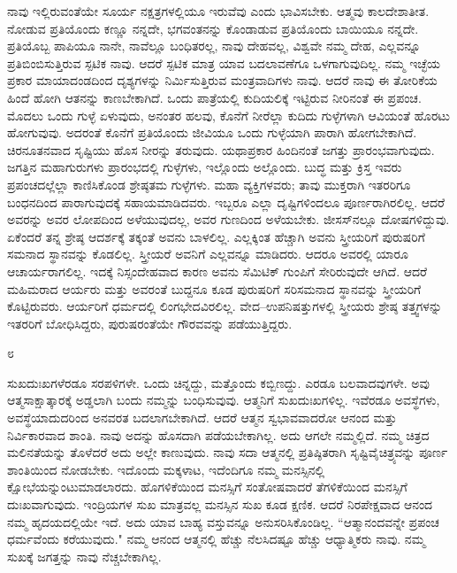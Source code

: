 ನಾವು ಇಲ್ಲಿರುವಂತೆಯೇ ಸೂರ್ಯ ನಕ್ಷತ್ರಗಳಲ್ಲಿಯೂ ಇರುವೆವು ಎಂದು ಭಾವಿಸಬೇಕು. ಆತ್ಮವು ಕಾಲದೇಶಾತೀತ. ನೋಡುವ ಪ್ರತಿಯೊಂದು ಕಣ್ಣೂ ನನ್ನದೇ, ಭಗವಂತನನ್ನು ಕೊಂಡಾಡುವ ಪ್ರತಿಯೊಂದು ಬಾಯಿಯೂ ನನ್ನದೇ. ಪ್ರತಿಯೊಬ್ಬ ಪಾಪಿಯೂ ನಾನೇ, ನಾವೆಲ್ಲೂ ಬಂಧಿತರಲ್ಲ, ನಾವು ದೇಹವಲ್ಲ, ವಿಶ್ವವೇ ನಮ್ಮ ದೇಹ, ಎಲ್ಲವನ್ನೂ ಪ್ರತಿಬಿಂಬಿಸುತ್ತಿರುವ ಸ್ಪಟಿಕ ನಾವು. ಆದರೆ ಸ್ಪಟಿಕ ಮಾತ್ರ ಯಾವ ಬದಲಾವಣೆಗೂ ಒಳಗಾಗುವುದಿಲ್ಲ. ನಮ್ಮ ಇಚ್ಛೆಯ ಪ್ರಕಾರ ಮಾಯಾದಂಡದಿಂದ ದೃಶ್ಯಗಳನ್ನು ನಿರ್ಮಿಸುತ್ತಿರುವ ಮಂತ್ರವಾದಿಗಳು ನಾವು. ಆದರೆ ನಾವು ಈ ತೋರಿಕೆಯ ಹಿಂದೆ ಹೋಗಿ ಆತನನ್ನು ಕಾಣಬೇಕಾಗಿದೆ. ಒಂದು ಪಾತ್ರೆಯಲ್ಲಿ ಕುದಿಯಲಿಕ್ಕೆ ಇಟ್ಟಿರುವ ನೀರಿನಂತೆ ಈ ಪ್ರಪಂಚ. ಮೊದಲು ಒಂದು ಗುಳ್ಳೆ ಏಳುವುದು, ಅನಂತರ ಹಲವು, ಕೊನೆಗೆ ನೀರೆಲ್ಲಾ ಕುದಿದು ಗುಳ್ಳೆಗಳಾಗಿ ಆವಿಯಂತೆ ಹೊರಟು ಹೋಗುವುವು. ಅದರಂತೆ ಕೊನೆಗೆ ಪ್ರತಿಯೊಂದು ಜೀವಿಯೂ ಒಂದು ಗುಳ್ಳೆಯಾಗಿ ಪಾರಾಗಿ ಹೋಗಬೇಕಾಗಿದೆ. ಚಿರನೂತನವಾದ ಸೃಷ್ಟಿಯು ಹೊಸ ನೀರನ್ನು ತರುವುದು. ಯಥಾಪ್ರಕಾರ ಹಿಂದಿನಂತೆ ಜಗತ್ತು ಪ್ರಾರಂಭವಾಗುವುದು. ಜಗತ್ತಿನ ಮಹಾಗುರುಗಳು ಪ್ರಾರಂಭದಲ್ಲಿ ಗುಳ್ಳೆಗಳು, ಇಲ್ಲೊಂದು ಅಲ್ಲೊಂದು. ಬುದ್ಧ ಮತ್ತು ಕ್ರಿಸ್ತ ಇವರು ಪ್ರಪಂಚದಲ್ಲೆಲ್ಲಾ ಕಾಣಿಸಿಕೊಂಡ ಶ್ರೇಷ್ಠತಮ ಗುಳ್ಳೆಗಳು. ಮಹಾ ವ್ಯಕ್ತಿಗಳವರು; ತಾವು ಮುಕ್ತರಾಗಿ ಇತರರಿಗೂ ಬಂಧನದಿಂದ ಪಾರಾಗುವುದಕ್ಕೆ ಸಹಾಯಮಾಡಿದವರು. ಇಬ್ಬರೂ ಎಲ್ಲಾ ದೃಷ್ಟಿಗಳಿಂದಲೂ ಪೂರ್ಣರಾಗಿರಲಿಲ್ಲ. ಆದರೆ ಅವರನ್ನು ಅವರ ಲೋಪದಿಂದ ಅಳೆಯುವುದಲ್ಲ, ಅವರ ಗುಣದಿಂದ ಅಳೆಯಬೇಕು. ಜೀಸಸ್‌ನಲ್ಲೂ ದೋಷಗಳಿದ್ದುವು. ಏಕೆಂದರೆ ತನ್ನ ಶ್ರೇಷ್ಠ ಆದರ್ಶಕ್ಕೆ ತಕ್ಕಂತೆ ಅವನು ಬಾಳಲಿಲ್ಲ. ಎಲ್ಲಕ್ಕಿಂತ ಹೆಚ್ಚಾಗಿ ಅವನು ಸ್ತ್ರೀಯರಿಗೆ ಪುರುಷರಿಗೆ ಸಮನಾದ ಸ್ಥಾನವನ್ನು ಕೊಡಲಿಲ್ಲ. ಸ್ತ್ರೀಯರೆ ಅವನಿಗೆ ಎಲ್ಲವನ್ನೂ ಮಾಡಿದರು. ಆದರೂ ಅವರಲ್ಲಿ ಯಾರೂ ಆಚಾರ್ಯರಾಗಲಿಲ್ಲ. ಇದಕ್ಕೆ ನಿಸ್ಸಂದೇಹವಾದ ಕಾರಣ ಅವನು ಸೆಮಿಟಿಕ್ ಗುಂಪಿಗೆ ಸೇರಿರುವುದೇ ಆಗಿದೆ. ಆದರೆ ಮಹಿಮರಾದ ಆರ್ಯರು ಮತ್ತು ಅವರಂತೆ ಬುದ್ದನೂ ಕೂಡ ಪುರುಷರಿಗೆ ಸರಿಸಮನಾದ ಸ್ಥಾನವನ್ನು ಸ್ತ್ರೀಯರಿಗೆ ಕೊಟ್ಟಿರುವರು. ಆರ್ಯರಿಗೆ ಧರ್ಮದಲ್ಲಿ ಲಿಂಗಭೇದವಿರಲಿಲ್ಲ. ವೇದ–ಉಪನಿಷತ್ತುಗಳಲ್ಲಿ ಸ್ತ್ರೀಯರು ಶ್ರೇಷ್ಠ ತತ್ತ್ವಗಳನ್ನು ಇತರರಿಗೆ ಬೋಧಿಸಿದ್ದರು, ಪುರುಷರಂತೆಯೇ ಗೌರವವನ್ನು ಪಡೆಯುತ್ತಿದ್ದರು.

\begin{center}
೮
\end{center}

ಸುಖದುಃಖಗಳೆರಡೂ ಸರಪಳಿಗಳೇ. ಒಂದು ಚಿನ್ನದ್ದು, ಮತ್ತೊಂದು ಕಬ್ಬಿಣದ್ದು. ಎರಡೂ ಬಲವಾದವುಗಳೇ. ಅವು ಆತ್ಮಸಾಕ್ಷಾತ್ಕಾರಕ್ಕೆ ಅಡ್ಡಲಾಗಿ ಬಂದು ನಮ್ಮನ್ನು ಬಂಧಿಸುವುವು. ಆತ್ಮನಿಗೆ ಸುಖದುಃಖಗಳಿಲ್ಲ. ಇವೆರಡೂ ಅವಸ್ಥೆಗಳು, ಅವಸ್ಥೆಯಾದುದರಿಂದ ಅನವರತ ಬದಲಾಗಬೇಕಾಗಿದೆ. ಆದರೆ ಆತ್ಮನ ಸ್ವಭಾವವಾದರೋ ಆನಂದ ಮತ್ತು ನಿರ್ವಿಕಾರವಾದ ಶಾಂತಿ. ನಾವು ಅದನ್ನು ಹೊಸದಾಗಿ ಪಡೆಯಬೇಕಾಗಿಲ್ಲ. ಅದು ಆಗಲೇ ನಮ್ಮಲ್ಲಿದೆ. ನಮ್ಮ ಚಿತ್ರದ ಮಲಿನತೆಯನ್ನು ತೊಳೆದರೆ ಅದು ಅಲ್ಲೇ ಕಾಣುವುದು. ನಾವು ಸದಾ ಆತ್ಮನಲ್ಲಿ ಪ್ರತಿಷ್ಠಿತರಾಗಿ ಸೃಷ್ಟಿವೈಚಿತ್ರ್ಯವನ್ನು ಪೂರ್ಣ ಶಾಂತಿಯಿಂದ ನೋಡಬೇಕು. ಇದೊಂದು ಮಕ್ಕಳಾಟ, ಇದೆಂದಿಗೂ ನಮ್ಮ ಮನಸ್ಸಿನಲ್ಲಿ ಕ್ಷೋಭೆಯನ್ನುಂಟುಮಾಡಲಾರದು. ಹೊಗಳಿಕೆಯಿಂದ ಮನಸ್ಸಿಗೆ ಸಂತೋಷವಾದರೆ ತೆಗಳಿಕೆಯಿಂದ ಮನಸ್ಸಿಗೆ ದುಃಖವಾಗುವುದು. ಇಂದ್ರಿಯಗಳ ಸುಖ ಮಾತ್ರವಲ್ಲ ಮನಸ್ಸಿನ ಸುಖ ಕೂಡ ಕ್ಷಣಿಕ. ಆದರೆ ನಿರಪೇಕ್ಷವಾದ ಆನಂದ ನಮ್ಮ ಹೃದಯದಲ್ಲಿಯೇ ಇದೆ. ಅದು ಯಾವ ಬಾಹ್ಯ ವಸ್ತುವನ್ನೂ ಅನುಸರಿಸಿಕೊಂಡಿಲ್ಲ. “ಆತ್ಮಾನಂದವನ್ನೇ ಪ್ರಪಂಚ ಧರ್ಮವೆಂದು ಕರೆಯುವುದು." ನಮ್ಮ ಆನಂದ ಆತ್ಮನಲ್ಲಿ ಹೆಚ್ಚು ನೆಲಸಿದಷ್ಟೂ ಹೆಚ್ಚು ಆಧ್ಯಾತ್ಮಿಕರು ನಾವು. ನಮ್ಮ ಸುಖಕ್ಕೆ ಜಗತ್ತನ್ನು ನಾವು ನೆಚ್ಚಬೇಕಾಗಿಲ್ಲ.

